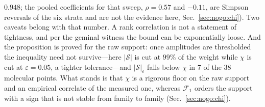 $0.948$; the pooled coefficients for that sweep, $\rho=0.57$ and $-0.11$, are Simpson reversals of the
six strata and are not the evidence here, Sec.~\ref{sec:nogo:chi}). Two caveats belong with that number. A rank correlation is not a statement of tightness,
and per the geminal witness the bound can be exponentially loose. And the proposition is proved for the
raw support: once amplitudes are thresholded the inequality need not survive---here $|\mathcal S|$ is cut
at $99\%$ of the weight while $\chi$ is cut at $\varepsilon=0.05$, a tighter tolerance---and
$|\mathcal S|_\varepsilon$ falls below $\chi$ in $7$ of the $38$ molecular points. What stands is that $\chi$ is a rigorous floor on
the raw support and an empirical correlate of the measured one, whereas $\mathcal F_1$ orders the
support with a sign that is not stable from family to family (Sec.~\ref{sec:nogo:chi}).

